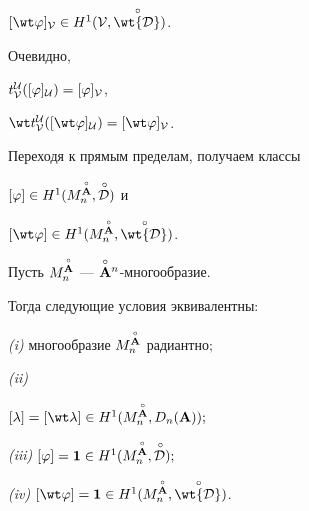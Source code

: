 $[\wt\varphi]_{\cal V}\in H^1 ({\cal V},{\puto{\wt {\cal D}}})$.


Очевидно,


$t^{\cal U}_{\cal V}([\varphi]_{\cal U})=[\varphi]_{\cal V}$,


$\wt t{}^{\cal U}_{\cal V}([\wt\varphi]_{\cal U})=


[\wt\varphi]_{\cal V}$.


Переходя к прямым пределам, получаем классы


$[\varphi]\in H^1 (M^{\overset{\circ}{\bold A}{}}_n, {\overset{\,\circ}{\cal D}{}})$ и


$[\wt\varphi]\in H^1 (M^{\Ao}_n, {\puto{\wt{\cal D}}})$.








\begin{thm}


Пусть $M^{\overset{\circ}{\bold A}{}}_n$ ---  $\overset{\circ}{\bold A}{}^n$-многообразие.


Тогда следующие условия эквивалентны\/${:}$





{\em (i)} многообразие $M^{\overset{\circ}{\bold A}{}}_n$ радиантно\/$;$





{\em (ii)}


$[\lambda]=[\wt\lambda] \in H^1 (M^{\Ao}_n, D_n(\A));$





{\em (iii)} $[\varphi]={\bold 1}\in H^1 (M^{\overset{\circ}{\bold A}{}}_n, \overset{\,\circ}{\cal D}{});$





{\em (iv)} $[\wt\varphi]={\bold 1}\in H^1 (M^{\Ao}_n, \puto{\wt{\cal D}})$.


\end{thm}








